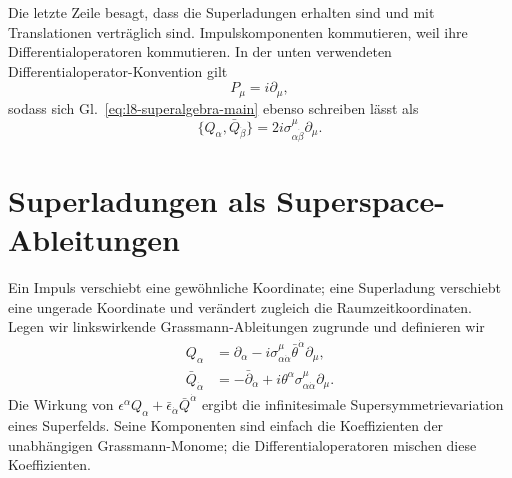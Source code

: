 Die letzte Zeile besagt, dass die Superladungen erhalten sind und mit Translationen verträglich sind. Impulskomponenten kommutieren, weil ihre Differentialoperatoren kommutieren. In der unten verwendeten Differentialoperator-Konvention gilt
\begin{equation}
P_\mu=i\partial_\mu,
\end{equation}
sodass sich Gl.~\eqref{eq:l8-superalgebra-main} ebenso schreiben lässt als
\begin{equation}
\{Q_\alpha,\bar Q_{\dot\beta}\}
=2i\sigma^\mu_{\alpha\dot\beta}\partial_\mu.
\end{equation}

\section{Superladungen als Superspace-Ableitungen}

Ein Impuls verschiebt eine gewöhnliche Koordinate; eine Superladung verschiebt eine ungerade Koordinate und verändert zugleich die Raumzeitkoordinaten. Legen wir linkswirkende Grassmann-Ableitungen zugrunde und definieren wir
\begin{align}
Q_\alpha
&=\partial_\alpha
-i\sigma^\mu_{\alpha\dot\alpha}
\bar\theta^{\dot\alpha}\partial_\mu,
\label{eq:l8-Q}\\
\bar Q_{\dot\alpha}
&=-\bar\partial_{\dot\alpha}
+i\theta^\alpha\sigma^\mu_{\alpha\dot\alpha}\partial_\mu.
\label{eq:l8-Qbar}
\end{align}
Die Wirkung von \(\epsilon^\alpha Q_\alpha+
\bar\epsilon_{\dot\alpha}\bar Q^{\dot\alpha}\) ergibt die infinitesimale Supersymmetrievariation eines Superfelds. Seine Komponenten sind einfach die Koeffizienten der unabhängigen Grassmann-Monome; die Differentialoperatoren mischen diese Koeffizienten.

\begin{classroomqa}
\end{classroomqa}

\begin{classroomqa}
\end{classroomqa}

